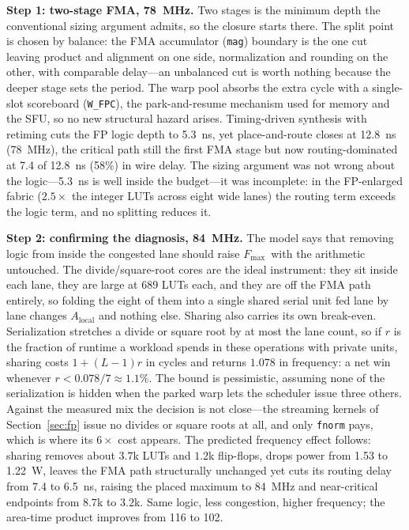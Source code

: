 \documentclass[10pt,conference]{IEEEtran}
\newcommand{\Fmax}{$F_{\mathrm{max}}$}
\begin{document}
\textbf{Step 1: two-stage FMA, 78~MHz.} Two stages is the minimum depth the
conventional sizing argument admits, so the closure starts there. The split point
is chosen by balance: the FMA accumulator (\texttt{mag}) boundary is the one cut
leaving product and alignment on one side, normalization and rounding on the
other, with comparable delay---an unbalanced cut is worth nothing because the
deeper stage sets the period. The warp pool absorbs the extra cycle with a
single-slot scoreboard (\texttt{W\_FPC}), the park-and-resume mechanism used for
memory and the SFU, so no new structural hazard arises. Timing-driven synthesis
with retiming cuts the FP logic depth to 5.3~ns, yet place-and-route closes at
12.8~ns (78~MHz), the critical path still the first FMA stage but now
routing-dominated at 7.4 of 12.8~ns (58\%) in wire delay. The sizing argument was
not wrong about the logic---5.3~ns is well inside the budget---it was incomplete:
in the FP-enlarged fabric ($2.5\times$ the integer LUTs across eight wide lanes)
the routing term exceeds the logic term, and no splitting reduces it.

\textbf{Step 2: confirming the diagnosis, 84~MHz.} The model says that removing
logic from inside the congested lane should raise \Fmax\ with the arithmetic
untouched. The divide/square-root cores are the ideal instrument: they sit inside
each lane, they are large at 689 LUTs each, and they are off the FMA path
entirely, so folding the eight of them into a single shared serial unit fed lane
by lane changes $A_{\text{local}}$ and nothing else. Sharing also carries its own
break-even. Serialization stretches a divide or square root by at most the lane
count, so if $r$ is the fraction of runtime a workload spends in these operations
with private units, sharing costs $1+(L-1)r$ in cycles and returns $1.078$ in
frequency: a net win whenever $r < 0.078/7 \approx 1.1\%$. The bound is
pessimistic, assuming none of the serialization is hidden when the parked warp
lets the scheduler issue three others. Against the measured mix the decision is
not close---the streaming kernels of Section~\ref{sec:fp} issue no divides or
square roots at all, and only \texttt{fnorm} pays, which is where its $6\times$
cost appears. The predicted frequency effect follows: sharing removes about
$3.7$k LUTs and $1.2$k flip-flops, drops power from 1.53 to 1.22~W, leaves the FMA
path structurally unchanged yet cuts its routing delay from 7.4 to 6.5~ns, raising
the placed maximum to 84~MHz and near-critical endpoints from $8.7$k to $3.2$k.
Same logic, less congestion, higher frequency; the area-time product improves from
116 to 102.
\end{document}
